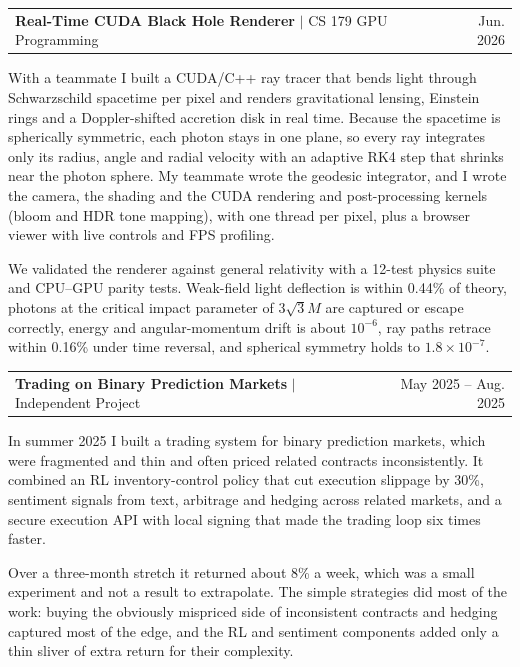 \documentclass[letterpaper,10pt]{article}
\makeatletter
\newif\ifafterhead
\newcommand{\cvProject}[2]{%
  \par\ifafterhead\vspace{5.2pt}\else\vspace{5pt}\fi\global\afterheadfalse\hspace*{0.15in}%
  \begin{tabular*}{0.97\textwidth}{l@{\extracolsep{\fill}}r}
    #1 & #2 \\
  \end{tabular*}\par\nopagebreak\vspace{0pt}\nopagebreak}
\makeatother
\begin{document}
\cvProject{\textbf{Real-Time CUDA Black Hole Renderer} $|$ \small{CS 179 GPU Programming}}{Jun. 2026}
\begin{cvBody}
With a teammate I built a CUDA/C++ ray tracer that bends light through Schwarzschild spacetime per pixel and renders gravitational lensing, Einstein rings and a Doppler-shifted accretion disk in real time. Because the spacetime is spherically symmetric, each photon stays in one plane, so every ray integrates only its radius, angle and radial velocity with an adaptive RK4 step that shrinks near the photon sphere. My teammate wrote the geodesic integrator, and I wrote the camera, the shading and the CUDA rendering and post-processing kernels (bloom and HDR tone mapping), with one thread per pixel, plus a browser viewer with live controls and FPS profiling.

We validated the renderer against general relativity with a 12-test physics suite and CPU--GPU parity tests. Weak-field light deflection is within 0.44\% of theory, photons at the critical impact parameter of $3\sqrt{3}M$ are captured or escape correctly, energy and angular-momentum drift is about $10^{-6}$, ray paths retrace within 0.16\% under time reversal, and spherical symmetry holds to $1.8\times10^{-7}$.
\end{cvBody}

\cvProject{\textbf{Trading on Binary Prediction Markets} $|$ \small{Independent Project}}{May 2025 -- Aug. 2025}
\begin{cvBody}
In summer 2025 I built a trading system for binary prediction markets, which were fragmented and thin and often priced related contracts inconsistently. It combined an RL inventory-control policy that cut execution slippage by 30\%, sentiment signals from text, arbitrage and hedging across related markets, and a secure execution API with local signing that made the trading loop six times faster.

Over a three-month stretch it returned about 8\% a week, which was a small experiment and not a result to extrapolate. The simple strategies did most of the work: buying the obviously mispriced side of inconsistent contracts and hedging captured most of the edge, and the RL and sentiment components added only a thin sliver of extra return for their complexity.
\end{cvBody}

\end{document}
